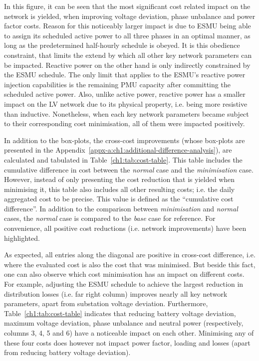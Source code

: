 In this figure, it can be seen that the most significant cost related impact on the network is yielded, when improving voltage deviation, phase unbalance and power factor costs.
Reason for this noticeably larger impact is due to ESMU being able to assign its scheduled active power to all three phases in an optimal manner, as long as the predetermined half-hourly schedule is obeyed.
It is this obedience constraint, that limits the extend by which all other key network parameters can be impacted.
Reactive power on the other hand is only indirectly constrained by the ESMU schedule.
The only limit that applies to the ESMU's reactive power injection capabilities is the remaining PMU capacity after committing the scheduled active power.
Also, unlike active power, reactive power has a smaller impact on the LV network due to its physical property, i.e. being more resistive than inductive.
Nonetheless, when each key network parameters became subject to their corresponding cost minimisation, all of them were impacted positively.

In addition to the box-plots, the cross-cost improvements (whose box-plots are presented in the Appendix~\ref{appx-a:ch1:additional-difference-analysis}), are calculated and tabulated in Table~\ref{ch1:tab:cost-table}.
This table includes the cumulative difference in cost between the \textit{normal} case and the \textit{minimisation} case.
However, instead of only presenting the cost reduction that is yielded when minimising it, this table also includes all other resulting costs; i.e. the daily aggregated cost to be precise.
This value is defined as the ``cumulative cost difference''.
In addition to the comparison between \textit{minimisation} and \textit{normal} cases, the \textit{normal} case is compared to the \textit{base} case for reference.
For convenience, all positive cost reductions (i.e. network improvements) have been highlighted.



As expected, all entries along the diagonal are positive in cross-cost difference, i.e. where the evaluated cost is also the cost that was minimised.
But beside this fact, one can also observe which cost minimisation has an impact on different costs.
For example, adjusting the ESMU schedule to achieve the largest reduction in distribution losses (i.e. far right column) improves nearly all key network parameters, apart from substation voltage deviation.
Furthermore, Table~\ref{ch1:tab:cost-table} indicates that reducing battery voltage deviation, maximum voltage deviation, phase unbalance and neutral power (respectively, columns 3, 4, 5 and 6) have a noticeable impact on each other.
Minimising any of these four costs does however not impact power factor, loading and losses (apart from reducing battery voltage deviation).

